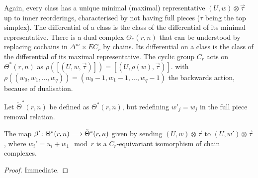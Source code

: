 Again, every class has a unique minimal (maximal) representative $(U,w)\otimes \vec{\tau}$ up to inner reorderings, characterised by not having full pieces ($\tau$ being the top simplex). The differential of a class is the class of the differential of its minimal representative. There is a dual complex $\Theta_*(r,n)$ that can be understood by replacing cochains in $\Delta^m\times EC_r$ by chains. Its differential on a class is the class of the differential of its maximal representative. The cyclic group $C_r$ acts on $\Theta^*(r,n)$ as $\rho([(U,w,\vec{\tau})]) = [(U,\rho(w),\vec{\tau})]$. with $\rho((w_0,w_1,\ldots,w_q)) = (w_0-1,w_1-1,\ldots,w_q-1)$ the backwards action, because of dualisation.  



\begin{definition} Let $\check{\Theta}^*(r,n)$ be defined as $\Theta^*(r,n)$, but redefining $w'_j = w_j$ in the full piece removal relation.
\end{definition}
\begin{lemma}
	The map $\beta'\colon \Theta^*(r,n)\longrightarrow \check{\Theta}^*(r,n)$ given by sending $(U,w)\otimes \vec{\tau}$ to $(U,w')\otimes \vec{\tau}$, where $w_i' = u_i+w_1\mod r$ is a $C_r$-equivariant isomorphism of chain complexes.
\end{lemma}
\begin{proof} Immediate.
\end{proof}

